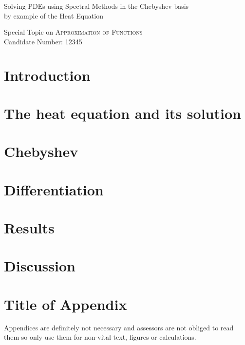 \documentclass[12pt,a4paper]{article}
\title{\topictitle}
\author{Candidate \candidatenumber}
\date{\today}
\newcommand{\topictitle}{Solving PDEs using Spectral Methods in the Chebyshev basis \\ \large by example of the Heat Equation}
\newcommand{\candidatenumber}{12345}
\newcommand{\course}{Approximation of Functions}
\begin{document}
  \begin{center}
    \Large \topictitle \\
    \vspace{.3cm}

    \normalsize Special Topic on \textcolor{themecolor3}{\textsc{\course}}\\
    \normalsize Candidate Number: \textcolor{themecolor3}{\candidatenumber}
    \vspace{.3cm}
  \end{center}

  \begin{abstract}
    Insert some waffle here if you want. Abstracts are optional for
    special topics but are part of page count.
  \end{abstract}

  \section{Introduction}
  \lipsum

  \section{The heat equation and its solution}
  \lipsum

  \section{Chebyshev}
  \lipsum

  \section{Differentiation}
  \lipsum

  \section{Results}
  \section{Discussion}

  \appendix

  \section{Title of Appendix}
  Appendices are definitely not necessary and assessors are not obliged to read them so only use them for non-vital text, figures or calculations.
\end{document}
